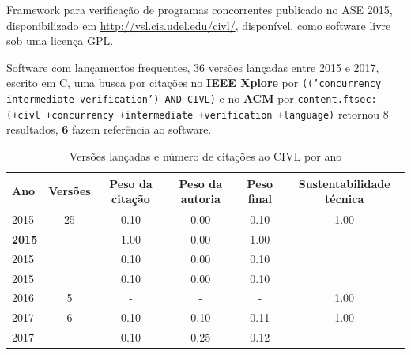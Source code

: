 Framework para verificação de programas concorrentes
publicado no ASE 2015,
disponibilizado em \url{http://vsl.cis.udel.edu/civl/},
disponível,
como software livre
sob uma licença GPL.

Software com lançamentos frequentes,
36 versões lançadas
entre 2015 e 2017,
escrito em C,
uma busca por citações no {\bf IEEE Xplore} por
\texttt{(('concurrency intermediate verification') AND CIVL)}
e no {\bf ACM} por
\texttt{content.ftsec:(+civl +concurrency +intermediate +verification +language)}
retornou
8 resultados,
{\bf 6} fazem referência ao software.


\begin{table}[H]
\caption{Versões lançadas e número de citações ao CIVL por ano}
\centering
\begin{tabular}{| l | c | c | c | c | c |}
  \hline
  Ano & Versões & Peso da citação & Peso da autoria & Peso final & Sustentabilidade técnica \\
  \hline
            2015
          &
          25
          &
          0.10
          &
          0.00
          &
          0.10
          &
            {\color{blue} 1.00}
          \\
            {\bf 2015}
          &
          
          &
          1.00
          &
          0.00
          &
          1.00
          &
          \\
            2015
          &
          
          &
          0.10
          &
          0.00
          &
          0.10
          &
          \\
            2015
          &
          
          &
          0.10
          &
          0.00
          &
          0.10
          &
          \\
\hline
        2016 & 5 & - & - & -
        &
          {\color{blue} 1.00}
        \\
\hline
            2017
          &
          6
          &
          0.10
          &
          0.10
          &
          0.11
          &
            {\color{blue} 1.00}
          \\
            2017
          &
          
          &
          0.10
          &
          0.25
          &
          0.12
          &
          \\
\hline
\end{tabular}
\end{table}


